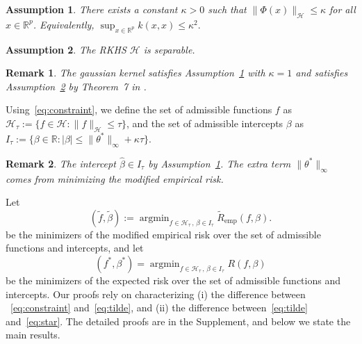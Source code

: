 \documentclass[twoside, onecolumn]{article}
\def\R{\mathbb{R}}
\def\Hcal{\mathcal{H}}
\def\Hcal{\mathcal{H}}
\DeclareMathOperator*{\argmin}{argmin}
\newtheorem{definition}{Definition}
\newtheorem{assumption}{Assumption}
\newtheorem{remark}{Remark}
\begin{document}
\begin{assumption}\label{assump:KernBound}
There exists a constant $\kappa>0$ such that $\|\Phi(x)\|_{\mathcal{H}}\leq \kappa$ for all $x\in \mathbb{R}^{p}$. Equivalently, $
\sup_{x\in\mathbb{R}^{p}} k(x,x)\leq \kappa^{2}.$
\end{assumption}

\begin{assumption}\label{assump:Separable}
The RKHS $\mathcal{H}$ is separable.
\end{assumption}

\begin{remark}
The gaussian kernel satisfies Assumption~\ref{assump:KernBound} with $\kappa=1$ and satisfies Assumption~\ref{assump:Separable} by Theorem~7 in \cite{hein2004kernels}. 
\end{remark}

Using~\eqref{eq:constraint}, we define the set of admissible functions $f$ as $\Hcal_{\tau}:=\{f\in\Hcal: \|f\|_{\Hcal}\leq \tau\}$, and the set of admissible intercepts $\beta$ as $I_{\tau}:=\{\beta \in \R: |\beta|\leq \|\theta^*\|_{\infty} + \kappa \tau\}$.


\begin{remark}
The intercept $\widehat \beta\in I_{\tau}$ by Assumption~\ref{assump:KernBound}. The extra term $\|\theta^*\|_{\infty}$ comes from minimizing the modified empirical risk.
\end{remark}

Let 
\begin{equation}\label{eq:tilde}
(\widetilde{f} , \widetilde{\beta}):=\argmin_{f\in \mathcal{H}_\tau\,,\, \beta\in I_\tau} \widetilde{R}_{\text{emp}}(f, \beta).
\end{equation}
be the minimizers of the modified empirical risk over the set of admissible functions and intercepts, and let 
\begin{equation}\label{eq:star}
(f^\ast, \beta^\ast)=\argmin_{f\in \mathcal{H}_\tau \,,\, \beta\in I_\tau} R(f, \beta)
\end{equation}
be the minimizers of the expected risk over the set of admissible functions and intercepts. Our proofs rely on characterizing (i) the difference between ~\eqref{eq:constraint} and~\eqref{eq:tilde}, and (ii) the difference between~\eqref{eq:tilde} and~\eqref{eq:star}. The detailed proofs are in the Supplement, and below we state the main results.
\end{document}
